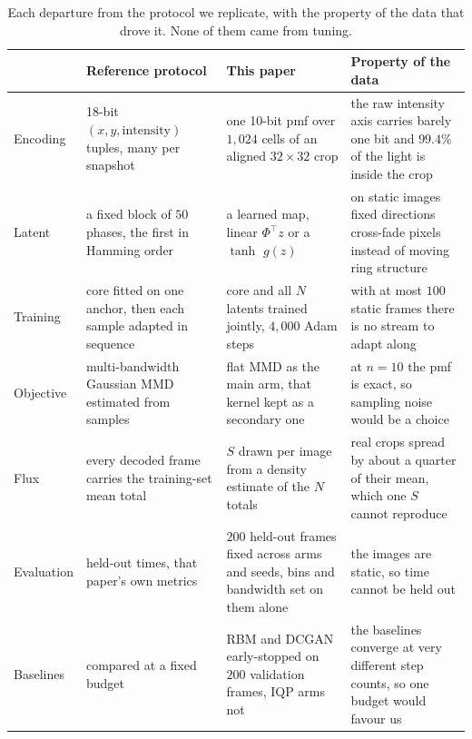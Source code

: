 \documentclass{article}
\begin{document}
\begin{table}[!b]
\centering
\caption{Each departure from the protocol we replicate, with the property of the data that drove
it. None of them came from tuning.}
\label{tab:diffs}
\scriptsize
\setlength{\tabcolsep}{3pt}
\begin{tabular}{p{}p{}p{}p{}}
\toprule
& Reference protocol & This paper & Property of the data \\
\midrule
Encoding &
18-bit $(x,y,\mathrm{intensity})$ tuples, many per snapshot &
one 10-bit pmf over $1{,}024$ cells of an aligned $32\times32$ crop &
the raw intensity axis carries barely one bit and $99.4\%$ of the light is inside the crop \\
Latent &
a fixed block of $50$ phases, the first in Hamming order &
a learned map, linear $\Phi^{\!\top} z$ or a $\tanh$ $g(z)$ &
on static images fixed directions cross-fade pixels instead of moving ring structure \\
Training &
core fitted on one anchor, then each sample adapted in sequence &
core and all $N$ latents trained jointly, $4{,}000$ Adam steps &
with at most $100$ static frames there is no stream to adapt along \\
Objective &
multi-bandwidth Gaussian MMD estimated from samples &
flat MMD as the main arm, that kernel kept as a secondary one &
at $n=10$ the pmf is exact, so sampling noise would be a choice \\
Flux &
every decoded frame carries the training-set mean total &
$S$ drawn per image from a density estimate of the $N$ totals &
real crops spread by about a quarter of their mean, which one $S$ cannot reproduce \\
Evaluation &
held-out times, that paper's own metrics &
$200$ held-out frames fixed across arms and seeds, bins and bandwidth set on them alone &
the images are static, so time cannot be held out \\
Baselines &
compared at a fixed budget &
RBM and DCGAN early-stopped on $200$ validation frames, IQP arms not &
the baselines converge at very different step counts, so one budget would favour us \\
\bottomrule
\end{tabular}
\end{table}
\end{document}

